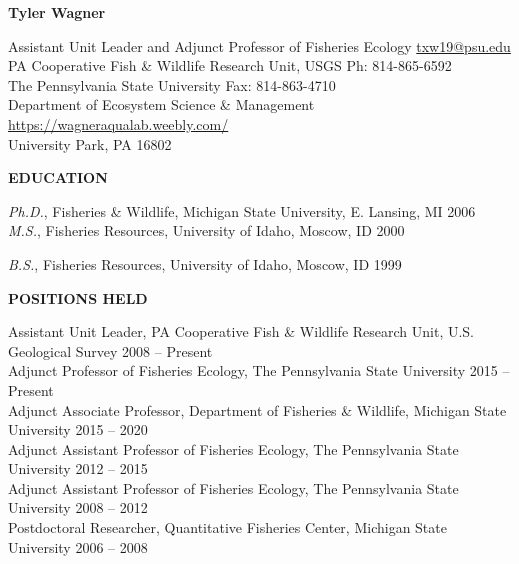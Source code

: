 \documentclass[10pt]{article}
\begin{document}
\centerline {\bf{\Large Tyler Wagner}}
\vspace{8pt}
\begin{flushleft}
Assistant Unit Leader and Adjunct Professor of Fisheries Ecology \hfill \href{mailto:txw19@psu.edu}{txw19@psu.edu}\\
PA Cooperative Fish \& Wildlife Research Unit, USGS \hfill Ph: 814-865-6592\\
 The Pennsylvania State University  \hfill Fax: 814-863-4710\\
 Department of Ecosystem Science \& Management \hfill  \url{https://wagneraqualab.weebly.com/}\\
University Park, PA 16802\\


\vspace{8pt}

\centerline {\bf{EDUCATION}}

\vspace{5pt}
{\sl Ph.D.}, 
Fisheries \& Wildlife, 
Michigan State University, E. Lansing, MI \hfill 2006 \\ 
\vspace{5pt}
{\sl M.S.}, Fisheries Resources,
University of Idaho, Moscow, ID \hfill 2000

\vspace{5pt}

{\sl B.S.}, Fisheries Resources,
University of Idaho, Moscow, ID \hfill 1999

\vspace{8pt}
\centerline {\bf{POSITIONS HELD}}
\vspace{5pt}
Assistant Unit Leader, PA Cooperative Fish \& Wildlife Research Unit, U.S. Geological Survey \hfill 2008 -- Present \\
Adjunct Professor of Fisheries Ecology, The Pennsylvania State University  \hfill 2015 -- Present \\
Adjunct Associate Professor, Department of Fisheries \& Wildlife, Michigan State University \hfill 2015 -- 2020 \\
Adjunct Assistant  Professor of Fisheries Ecology, The Pennsylvania State University  \hfill 2012 -- 2015 \\
Adjunct Assistant Professor of Fisheries Ecology, The Pennsylvania State University  \hfill 2008 -- 2012 \\
Postdoctoral Researcher, Quantitative Fisheries Center, Michigan State University \hfill 2006 -- 2008 \\


\end{flushleft}
\end{document}

